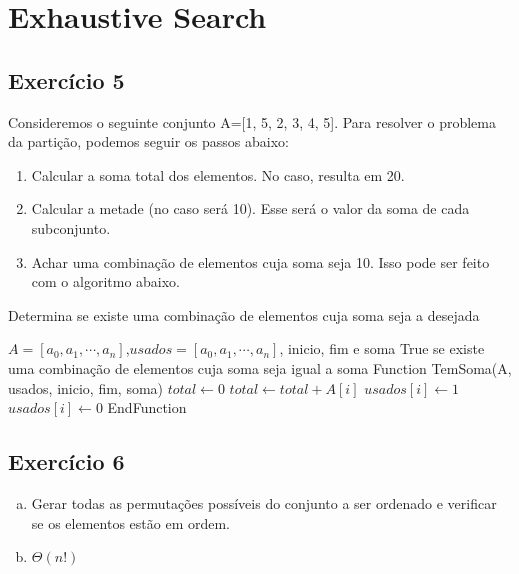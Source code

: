 
\newpage
\section{Exhaustive Search}\label{sec:exhaustive_force}

\subsection{Exercício 5}\label{sec:exer5}
Consideremos o seguinte conjunto A=[1, 5, 2, 3, 4, 5]. Para resolver o problema da
partição, podemos seguir os passos abaixo:
\begin{enumerate}
  \item Calcular a soma total dos elementos. No caso, resulta em 20.
  \item Calcular a metade (no caso será 10). Esse será o valor da soma de cada
  subconjunto.
  \item Achar uma combinação de elementos cuja soma seja 10. Isso pode ser feito
  com o algoritmo abaixo.
\end{enumerate}

\begin{algorithm}
  \caption{Determina se existe uma combinação de elementos cuja soma seja a desejada}
  \begin{algorithmic}
    \REQUIRE $A=[a_{0}, a_{1}, \cdots, a_{n}]$,$usados=[a_{0}, a_{1}, \cdots, a_{n}]$,
    inicio, fim e soma
    \ENSURE True se existe uma combinação de elementos cuja soma seja igual a soma
    \STATE Function TemSoma(A, usados, inicio, fim, soma)
    \STATE $total \leftarrow 0$
        \STATE $total \leftarrow total + A[i]$
      \ENDIF
    \ENDFOR
      \RETURN \TRUE
    \ENDIF
      \STATE $usados[i] \leftarrow 1$
        \RETURN \TRUE
      \ENDIF
      \STATE $usados[i] \leftarrow 0$
    \ENDFOR
    \RETURN \FALSE
    \STATE EndFunction
  \end{algorithmic}
\end{algorithm}

\subsection{Exercício 6}\label{sec:exer6}
\begin{enumerate}[a)]
  \item Gerar todas as permutações possíveis do conjunto a ser ordenado e verificar
  se os elementos estão em ordem.
  \item $\Theta(n!)$
\end{enumerate}


